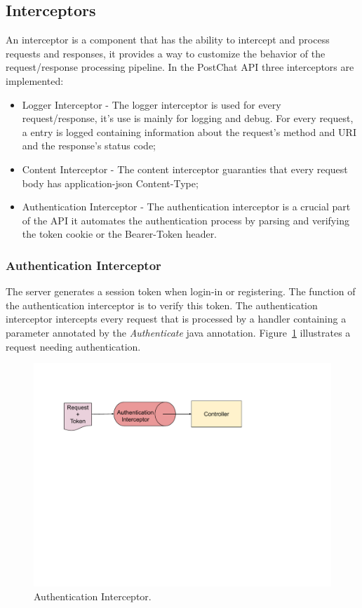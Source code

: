 \subsection{Interceptors}
An interceptor is a component that has the ability to intercept and process requests and responses, it provides a way to customize the behavior of the request/response processing pipeline. In the PostChat API three interceptors are implemented:

\begin{itemize}
        \item Logger Interceptor - The logger interceptor is used for every request/response, it's use is mainly for logging and debug. For every request, a entry is logged containing information about the request's method and URI and the response's status code;
        \item Content Interceptor - The content interceptor guaranties that every request body has application-json Content-Type;
        \item Authentication Interceptor - The authentication interceptor is a crucial part of the API it automates the authentication process by parsing and verifying the token cookie or the Bearer-Token header.
\end{itemize}

\subsubsection{Authentication Interceptor}
The server generates a session token when login-in or registering. The function of the authentication interceptor is to verify this token.
The authentication interceptor intercepts every request that is processed by a handler containing a parameter annotated by the \textit{Authenticate} java annotation.
Figure~\ref{fig:Interceptor Structure} illustrates a request needing authentication.

\begin{figure}[!ht]
	\centering
	\includegraphics[trim={0cm 12cm 5cm 2cm}, width=1\textwidth]{./Chapter4/Figures/Interceptor Structure}
	\caption{Authentication Interceptor.}
	\label{fig:Interceptor Structure}
\end{figure}



